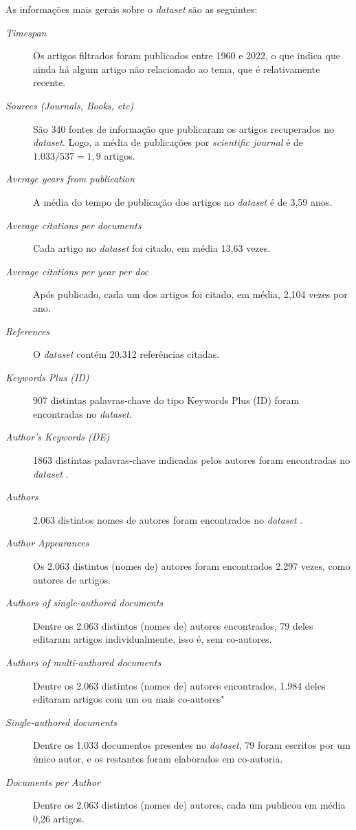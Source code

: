 As informações mais gerais sobre o \textit{dataset} são as seguintes:
\begin{description}
    \item [\textit{Timespan}] Os artigos filtrados foram publicados entre 1960 e 2022, o que indica que ainda há algum artigo não relacionado ao tema, que é relativamente recente.
    \item [\textit{Sources (Journals, Books, etc)}] São 340 fontes de informação que publicaram os artigos recuperados no \textit{dataset}. Logo, a média de publicações por \textit{scientific journal} é de $1.033/537=1,9$ artigos.
    \item [\textit{Average years from publication}] A média do tempo de publicação dos artigos no \textit{dataset} é de 3,59 anos.
    \item [\textit{Average citations per documents}] Cada artigo no \textit{dataset} foi citado, em média 13,63 vezes.
    \item [\textit{Average citations per year per doc}] Após publicado, cada um dos artigos foi citado, em média, 2,104 vezes por ano.
    \item [\textit{References}] O \textit{dataset} contém 20.312 referências citadas.
    \item [\textit{Keywords Plus (ID)}] 907 distintas palavras-chave do tipo Keywords Plus (ID) foram encontradas no \textit{dataset}.
    \item [\textit{Author's Keywords (DE)}] 1863 distintas palavras-chave indicadas pelos autores foram encontradas no \textit{dataset} .
    \item [\textit{Authors}] 2.063 distintos nomes de autores foram encontrados no \textit{dataset} .
    \item [\textit{Author Appearances}] Os 2.063 distintos (nomes de) autores foram encontrados 2.297 vezes, como autores de artigos.
    \item [\textit{Authors of single-authored documents}] Dentre os 2.063 distintos (nomes de) autores encontrados, 79 deles editaram artigos individualmente, isso é, sem co-autores.
    \item [\textit{Authors of multi-authored documents}] Dentre os 2.063 distintos (nomes de) autores encontrados, 1.984 deles editaram artigos com um ou mais co-autores"
    \item [\textit{Single-authored documents}] Dentre os 1.033 documentos presentes no \textit{dataset}, 79 foram escritos por um único autor, e os restantes foram elaborados em co-autoria.
    \item [\textit{Documents per Author}] Dentre os 2.063 distintos (nomes de) autores, cada um publicou em média 0,26 artigos.

\end{description}
